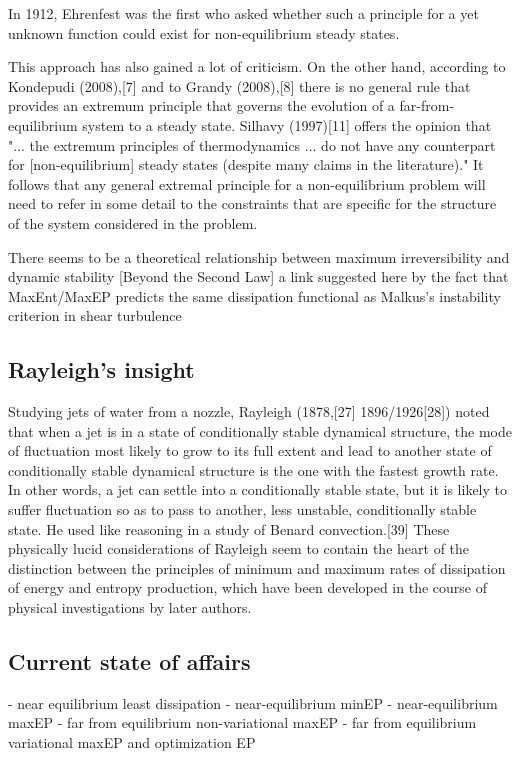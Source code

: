 \documentclass[a4paper,12pt,nofootinbib]{article}
\begin{document}
In 1912, Ehrenfest was the first who asked whether such a principle for a yet unknown function could exist for non-equilibrium steady states. 

This approach has also gained a lot of criticism.
On the other hand, according to Kondepudi (2008),[7] and to Grandy (2008),[8] there is no general rule that provides an extremum principle that governs the evolution of a far-from-equilibrium system to a steady state. 
Silhavy (1997)[11] offers the opinion that "... the extremum principles of thermodynamics ... do not have any counterpart for [non-equilibrium] steady states (despite many claims in the literature)." It follows that any general extremal principle for a non-equilibrium problem will need to refer in some detail to the constraints that are specific for the structure of the system considered in the problem.

There seems to be a theoretical relationship between maximum irreversibility and dynamic stability [Beyond the Second Law] a link suggested here by the fact that MaxEnt/MaxEP predicts the same dissipation functional as Malkus's instability criterion in shear turbulence

\subsection{Rayleigh's insight}
Studying jets of water from a nozzle, Rayleigh (1878,[27] 1896/1926[28]) noted that when a jet is in a state of conditionally stable dynamical structure, the mode of fluctuation most likely to grow to its full extent and lead to another state of conditionally stable dynamical structure is the one with the fastest growth rate. In other words, a jet can settle into a conditionally stable state, but it is likely to suffer fluctuation so as to pass to another, less unstable, conditionally stable state. He used like reasoning in a study of Benard convection.[39] These physically lucid considerations of Rayleigh seem to contain the heart of the distinction between the principles of minimum and maximum rates of dissipation of energy and entropy production, which have been developed in the course of physical investigations by later authors.

\subsection{Current state of affairs}

- near equilibrium least dissipation
- near-equilibrium minEP
- near-equilibrium maxEP
- far from equilibrium non-variational maxEP
- far from equilibrium variational maxEP and optimization EP
\end{document}
